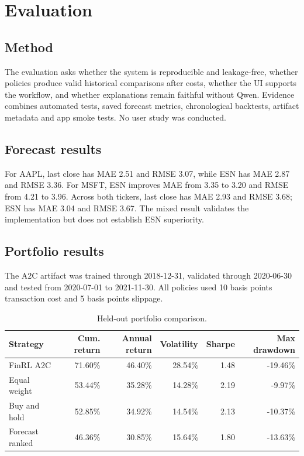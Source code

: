 \chapter{Evaluation}
\section{Method}
The evaluation asks whether the system is reproducible and leakage-free, whether policies produce valid historical comparisons after costs, whether the UI supports the workflow, and whether explanations remain faithful without Qwen. Evidence combines automated tests, saved forecast metrics, chronological backtests, artifact metadata and app smoke tests. No user study was conducted.

\section{Forecast results}
For AAPL, last close has MAE 2.51 and RMSE 3.07, while ESN has MAE 2.87 and RMSE 3.36. For MSFT, ESN improves MAE from 3.35 to 3.20 and RMSE from 4.21 to 3.96. Across both tickers, last close has MAE 2.93 and RMSE 3.68; ESN has MAE 3.04 and RMSE 3.67. The mixed result validates the implementation but does not establish ESN superiority.

\section{Portfolio results}
The A2C artifact was trained through 2018-12-31, validated through 2020-06-30 and tested from 2020-07-01 to 2021-11-30. All policies used 10 basis points transaction cost and 5 basis points slippage.

\begin{table}[H]\centering\caption{Held-out portfolio comparison.}\begin{tabular}{lrrrrr}\toprule Strategy & Cum. return & Annual return & Volatility & Sharpe & Max drawdown\\\midrule FinRL A2C & 71.60\% & 46.40\% & 28.54\% & 1.48 & -19.46\%\\ Equal weight & 53.44\% & 35.28\% & 14.28\% & 2.19 & -9.97\%\\ Buy and hold & 52.85\% & 34.92\% & 14.54\% & 2.13 & -10.37\%\\ Forecast ranked & 46.36\% & 30.85\% & 15.64\% & 1.80 & -13.63\%\\\bottomrule\end{tabular}\end{table}

